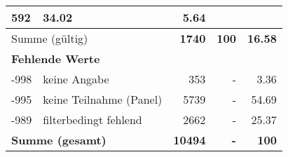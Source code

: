 \begin{longtable}{lXrrr}
       \num{592} &
       \num[round-mode=places,round-precision=2]{34.02} &
         \num[round-mode=places,round-precision=2]{5.64} \\
     \midrule
     \multicolumn{2}{l}{Summe (gültig)} &
       \textbf{\num{1740}} &
     \textbf{\num{100}} &
       \textbf{\num[round-mode=places,round-precision=2]{16.58}} \\
     \multicolumn{5}{l}{\textbf{Fehlende Werte}}\\
       -998 &
       keine Angabe &
         \num{353} &
        - &
         \num[round-mode=places,round-precision=2]{3.36} \\
       -995 &
       keine Teilnahme (Panel) &
         \num{5739} &
        - &
         \num[round-mode=places,round-precision=2]{54.69} \\
       -989 &
       filterbedingt fehlend &
         \num{2662} &
        - &
         \num[round-mode=places,round-precision=2]{25.37} \\
     \midrule
     \multicolumn{2}{l}{\textbf{Summe (gesamt)}} &
          \textbf{\num{10494}} &
        \textbf{-} &
        \textbf{\num{100}} \\
     \bottomrule
     \end{longtable}
     
